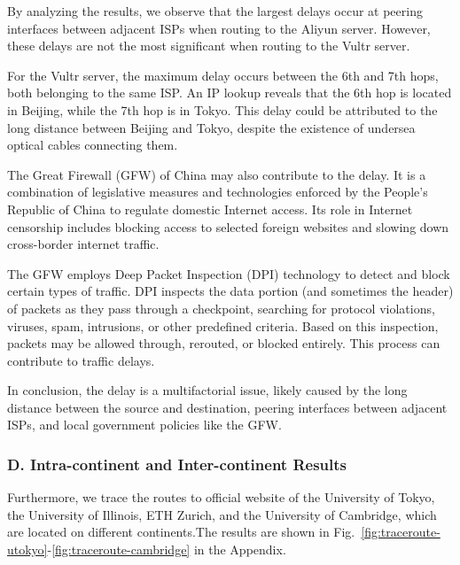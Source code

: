 \documentclass{cshwk}
\begin{document}
By analyzing the results, we observe that the largest delays occur at peering interfaces between adjacent ISPs when routing to the Aliyun server. However, these delays are not the most significant when routing to the Vultr server.

For the Vultr server, the maximum delay occurs between the 6th and 7th hops, both belonging to the same ISP. An IP lookup reveals that the 6th hop is located in Beijing, while the 7th hop is in Tokyo. This delay could be attributed to the long distance between Beijing and Tokyo, despite the existence of undersea optical cables connecting them.

The Great Firewall (GFW) of China may also contribute to the delay. It is a combination of legislative measures and technologies enforced by the People's Republic of China to regulate domestic Internet access. Its role in Internet censorship includes blocking access to selected foreign websites and slowing down cross-border internet traffic.

The GFW employs Deep Packet Inspection (DPI) technology to detect and block certain types of traffic. DPI inspects the data portion (and sometimes the header) of packets as they pass through a checkpoint, searching for protocol violations, viruses, spam, intrusions, or other predefined criteria. Based on this inspection, packets may be allowed through, rerouted, or blocked entirely. This process can contribute to traffic delays.

In conclusion, the delay is a multifactorial issue, likely caused by the long distance between the source and destination, peering interfaces between adjacent ISPs, and local government policies like the GFW.


\subsubsection*{D. Intra-continent and Inter-continent Results}

Furthermore, we trace the routes to official website of the University of Tokyo, the University of Illinois, ETH Zurich, and the University of Cambridge, which are located on different continents.The results are shown in Fig.~\ref{fig:traceroute-utokyo}-\ref{fig:traceroute-cambridge} in the Appendix.
\end{document}
